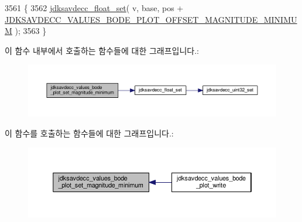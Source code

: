 \begin{DoxyCode}
3561 \{
3562     \hyperlink{group__endian_ga1f92dcb7b9e5f21f1df4b563ee9e04d5}{jdksavdecc\_float\_set}( v, base, pos + 
      \hyperlink{group__values__bode__plot_ga2989129caca431f3046063a15880f54e}{JDKSAVDECC\_VALUES\_BODE\_PLOT\_OFFSET\_MAGNITUDE\_MINIMUM} );
3563 \}
\end{DoxyCode}


이 함수 내부에서 호출하는 함수들에 대한 그래프입니다.\+:
\nopagebreak
\begin{figure}[H]
\begin{center}
\leavevmode
\includegraphics[width=350pt]{group__values__bode__plot_gac46cee4d37a2740863d8e6c20e0eb2b4_cgraph}
\end{center}
\end{figure}




이 함수를 호출하는 함수들에 대한 그래프입니다.\+:
\nopagebreak
\begin{figure}[H]
\begin{center}
\leavevmode
\includegraphics[width=350pt]{group__values__bode__plot_gac46cee4d37a2740863d8e6c20e0eb2b4_icgraph}
\end{center}
\end{figure}


